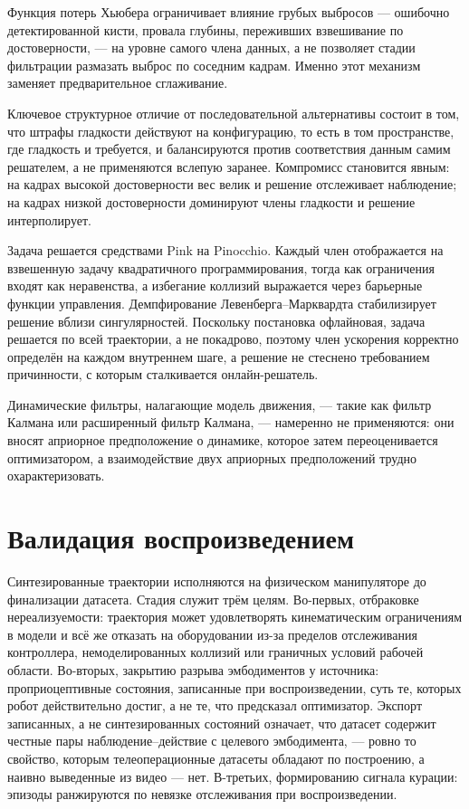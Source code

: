 \documentclass[12pt, a4paper, oneside]{report}
\begin{document}
Функция потерь Хьюбера ограничивает влияние грубых выбросов --- ошибочно
детектированной кисти, провала глубины, переживших взвешивание по достоверности,
--- на уровне самого члена данных, а не позволяет стадии фильтрации размазать
выброс по соседним кадрам. Именно этот механизм заменяет предварительное
сглаживание.

Ключевое структурное отличие от последовательной альтернативы состоит в том, что
штрафы гладкости действуют на конфигурацию, то есть в том пространстве, где
гладкость и требуется, и балансируются против соответствия данным самим
решателем, а не применяются вслепую заранее. Компромисс становится явным: на
кадрах высокой достоверности вес велик и решение отслеживает наблюдение; на
кадрах низкой достоверности доминируют члены гладкости и решение интерполирует.

Задача решается средствами Pink на Pinocchio. Каждый член отображается на
взвешенную задачу квадратичного программирования, тогда как ограничения входят
как неравенства, а избегание коллизий выражается через барьерные функции
управления. Демпфирование Левенберга--Марквардта стабилизирует решение вблизи
сингулярностей. Поскольку постановка офлайновая, задача решается по всей
траектории, а не покадрово, поэтому член ускорения корректно определён на каждом
внутреннем шаге, а решение не стеснено требованием причинности, с которым
сталкивается онлайн-решатель.

Динамические фильтры, налагающие модель движения, --- такие как фильтр Калмана
или расширенный фильтр Калмана, --- намеренно не применяются: они вносят
априорное предположение о динамике, которое затем переоценивается оптимизатором,
а взаимодействие двух априорных предположений трудно охарактеризовать.

\section{Валидация воспроизведением}

Синтезированные траектории исполняются на физическом манипуляторе до
финализации датасета. Стадия служит трём целям. Во-первых, отбраковке
нереализуемости: траектория может удовлетворять кинематическим ограничениям в
модели и всё же отказать на оборудовании из-за пределов отслеживания
контроллера, немоделированных коллизий или граничных условий рабочей области.
Во-вторых, закрытию разрыва эмбодиментов у источника: проприоцептивные
состояния, записанные при воспроизведении, суть те, которых робот действительно
достиг, а не те, что предсказал оптимизатор. Экспорт записанных, а не
синтезированных состояний означает, что датасет содержит честные пары
наблюдение--действие с целевого эмбодимента, --- ровно то свойство, которым
телеоперационные датасеты обладают по построению, а наивно выведенные из видео
--- нет. В-третьих, формированию сигнала курации: эпизоды ранжируются по
невязке отслеживания при воспроизведении.
\end{document}
